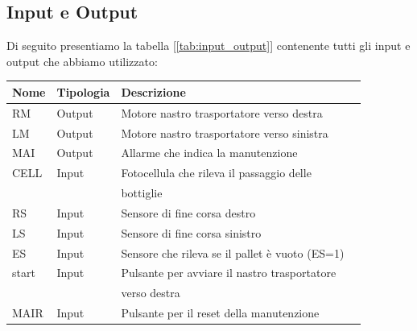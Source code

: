 \documentclass{article}
\begin{document}
\subsection{Input e Output}
Di seguito presentiamo la tabella [\ref{tab:input_output}] contenente tutti gli input e output che abbiamo utilizzato:
\begin{center}
    \begin{tabular}{l l l l }
        \toprule
        \textbf{Nome} & \textbf{Tipologia} & \textbf{Descrizione}                           \\
        \midrule
        \midrule
        RM            & Output             & Motore nastro trasportatore verso destra       \\
        \midrule
        LM            & Output             & Motore nastro trasportatore verso sinistra     \\
        \midrule
        MAI           & Output             & Allarme che indica la manutenzione             \\
        \midrule
        CELL          & Input              & Fotocellula che rileva il passaggio delle      \\
                      &                    & bottiglie                                      \\
        \midrule

        RS            & Input              & Sensore di fine corsa destro                   \\
        \midrule
        LS            & Input              & Sensore di fine corsa sinistro                 \\
        \midrule
        ES            & Input              & Sensore che rileva se il pallet è vuoto (ES=1) \\
        \midrule
        start         & Input              & Pulsante per avviare il nastro trasportatore   \\
                      &                    & verso destra                                   \\
        \midrule
        MAIR          & Input              & Pulsante per il reset della manutenzione       \\
        \bottomrule
    \end{tabular}
    \label{tab:input_output}
\end{center}
\end{document}

